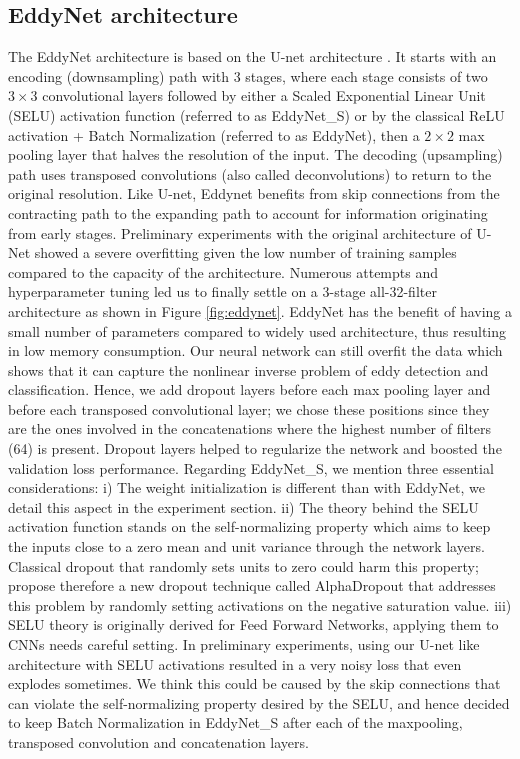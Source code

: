 \documentclass[journal]{IEEEtran}
\begin{document}
\subsection{EddyNet architecture}
The EddyNet architecture is based on the U-net architecture \cite{ronneberger2015u}. It starts with an encoding (downsampling) path with 3 stages, where each stage consists of two $3\times 3$ convolutional layers followed by either a Scaled Exponential Linear Unit (SELU) activation function \cite{klambauer2017self} (referred to as EddyNet\_S) or by the classical ReLU activation + Batch Normalization (referred to as EddyNet), then a $2\times 2$ max pooling layer that halves the resolution of the input. The decoding (upsampling) path uses transposed convolutions (also called deconvolutions) \cite{zeiler2010deconvolutional} to return to the original resolution. Like U-net, Eddynet benefits from skip connections from the contracting path to the expanding path to account for information originating from early stages. Preliminary experiments with the original architecture of U-Net showed a severe overfitting given the low number of training samples compared to the capacity of the architecture. Numerous attempts and hyperparameter tuning led us to finally settle on a 3-stage all-32-filter architecture as shown in Figure \ref{fig:eddynet}. EddyNet has the benefit of having a small number of parameters compared to widely used architecture, thus resulting in low memory consumption. Our neural network can still overfit the data which shows that it can capture the nonlinear inverse problem of eddy detection and classification. Hence, we add dropout layers before each max pooling layer and before each transposed convolutional layer; we chose these positions since they are the ones involved in the concatenations where the highest number of filters (64) is present. Dropout layers helped to regularize the network and boosted the validation loss performance. 
% 
% 
Regarding EddyNet\_S, we mention three essential considerations: i) The weight initialization is different than with EddyNet, we detail this aspect in the experiment section. ii) The theory behind the SELU activation function stands on the self-normalizing property which aims to keep the inputs close to a zero mean and unit variance through the network layers. Classical dropout that randomly sets units to zero could harm this property; \cite{klambauer2017self} propose therefore a new dropout technique called AlphaDropout that addresses this problem by randomly setting activations on the negative saturation value. iii) SELU theory is originally derived for Feed Forward Networks, applying them to CNNs needs careful setting. In preliminary experiments, using our U-net like architecture with SELU activations resulted in a very noisy loss that even explodes sometimes. We think this could be caused by the skip connections that can violate the self-normalizing property desired by the SELU, and hence decided to keep Batch Normalization in EddyNet\_S after each of the maxpooling, transposed convolution and concatenation layers. 
\end{document}
